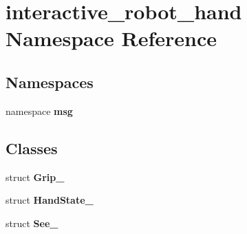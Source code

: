 \section{interactive\-\_\-robot\-\_\-hand Namespace Reference}
\label{namespaceinteractive__robot__hand}
\subsection*{Namespaces}
\begin{DoxyCompactItemize}
\item 
namespace {\bf msg}
\end{DoxyCompactItemize}
\subsection*{Classes}
\begin{DoxyCompactItemize}
\item 
struct {\bf Grip\-\_\-}
\item 
struct {\bf Hand\-State\-\_\-}
\item 
struct {\bf See\-\_\-}
\end{DoxyCompactItemize}
